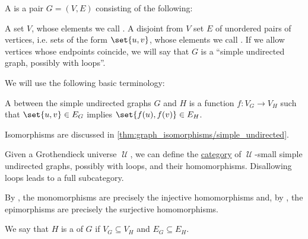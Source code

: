 \begin{definition}\label{def:undirected_graph}
  A  is a pair \( G = (V, E) \) consisting of the following:
  \begin{thmenum}[series=def:undirected_graph]
     A set \( V \), whose elements we call .
     A disjoint from \( V \) set \( E \) of unordered pairs of  vertices, i.e. sets of the form \( \set{ u, v } \), whose elements we call . If we allow vertices whose endpoints coincide, we will say that \( G \) is a \enquote{simple undirected graph, possibly with loops}.
  \end{thmenum}

  We will use the following basic terminology:
  \begin{thmenum}[resume=def:undirected_graph]
     A  between the simple undirected graphs \( G \) and \( H \) is a function \( f: V_G \to V_H \) such that \( \set{ u, v } \in E_G \) implies \( \set{ f(u), f(v) } \in E_H \).

    Isomorphisms are discussed in \cref{thm:graph_isomorphisms/simple_undirected}.

     Given a Grothendieck universe \( \mscrU \), we can define the \hyperref[def:category]{category} of \( \mscrU \)-small simple undirected graphs, possibly with loops, and their homomorphisms. Disallowing loops leads to a full subcategory.

    By , the monomorphisms are precisely the injective homomorphisms and, by , the epimorphisms are precisely the surjective homomorphisms.

     We say that \( H \) is a  of \( G \) if \( V_G \subseteq V_H \) and \( E_G \subseteq E_H \).
  \end{thmenum}
\end{definition}
